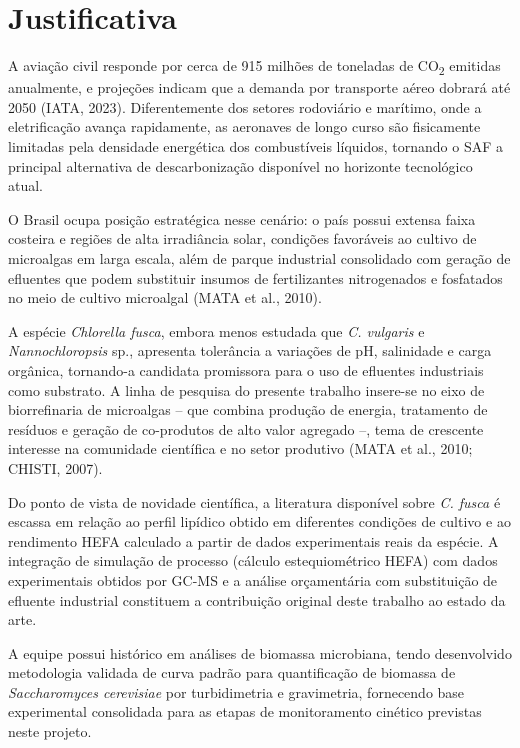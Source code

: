 
\section{Justificativa}

A aviação civil responde por cerca de 915 milhões de toneladas de
CO\textsubscript{2} emitidas anualmente, e projeções indicam que a demanda
por transporte aéreo dobrará até 2050 (IATA, 2023). Diferentemente dos
setores rodoviário e marítimo, onde a eletrificação avança rapidamente, as
aeronaves de longo curso são fisicamente limitadas pela densidade energética
dos combustíveis líquidos, tornando o SAF a principal alternativa de
descarbonização disponível no horizonte tecnológico atual.

O Brasil ocupa posição estratégica nesse cenário: o país possui extensa
faixa costeira e regiões de alta irradiância solar, condições favoráveis
ao cultivo de microalgas em larga escala, além de parque industrial
consolidado com geração de efluentes que podem substituir insumos de
fertilizantes nitrogenados e fosfatados no meio de cultivo microalgal
(MATA et al., 2010).

A espécie \textit{Chlorella fusca}, embora menos estudada que \textit{C.
vulgaris} e \textit{Nannochloropsis} sp., apresenta tolerância a variações
de pH, salinidade e carga orgânica, tornando-a candidata promissora para
o uso de efluentes industriais como substrato. A linha de pesquisa do
presente trabalho insere-se no eixo de biorrefinaria de microalgas --
que combina produção de energia, tratamento de resíduos e geração de
co-produtos de alto valor agregado --, tema de crescente interesse na
comunidade científica e no setor produtivo (MATA et al., 2010;
CHISTI, 2007).

Do ponto de vista de novidade científica, a literatura disponível sobre
\textit{C. fusca} é escassa em relação ao perfil lipídico obtido em
diferentes condições de cultivo e ao rendimento HEFA calculado a partir
de dados experimentais reais da espécie. A integração de simulação de
processo (cálculo estequiométrico HEFA) com dados experimentais obtidos
por GC-MS e a análise orçamentária com substituição de efluente industrial
constituem a contribuição original deste trabalho ao estado da arte.

A equipe possui histórico em análises de biomassa microbiana, tendo
desenvolvido metodologia validada de curva padrão para quantificação de
biomassa de \textit{Saccharomyces cerevisiae} por turbidimetria e
gravimetria, fornecendo base experimental consolidada para as etapas de
monitoramento cinético previstas neste projeto.

